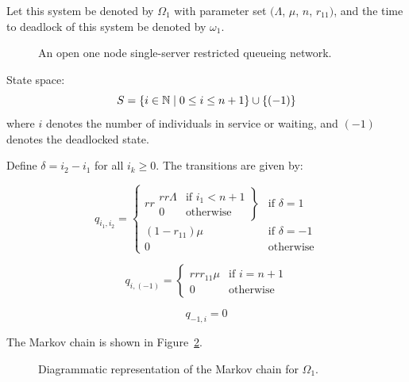 \documentclass{article}
\numberwithin{equation}{section}
\begin{document}
Let this system be denoted by $\Omega_1$ with parameter set $(\Lambda$, $\mu$, $n$, $r_{11})$, and the time to deadlock of this system be denoted by $\omega_1$.

\begin{figure}[!htbp]
  \begin{center}
  
  \end{center}
  \caption{An open one node single-server restricted queueing network.}
  \label{fig:queueingnetwork_1node}
\end{figure}

State space:
        \[S = \{i\in\mathbb{N} \nonscript\; | \nonscript\; 0 \leq i \leq n + 1
        \}\cup\{(-1)\}\]
where \(i\) denotes the number of individuals in service or waiting, and $(-1)$ denotes the deadlocked state.

Define $\delta = i_2 - i_1$ for all $i_k \geq 0$. The transitions are given by:

\begin{equation}
  q_{i_1, i_2} = \left\{
  \begin{matrix}{rr}
    \left. \begin{matrix}{rr}
      \Lambda & \text{if } i_1 < n + 1 \\
      0 & \text{otherwise}
    \end{matrix} \right\} & \text{if } \delta = 1 \\
    (1 - r_{11})\mu & \text{if } \delta = -1 \\
    0 & \text{otherwise}
  \end{matrix} \right.
\end{equation}

\begin{equation}
  q_{i, (-1)} = \left\{
  \begin{matrix}{rr}
    r_{11}\mu & \text{if } i = n + 1 \\
    0 & \text{otherwise}
  \end{matrix}
  \right.
\end{equation}

\begin{equation}
  q_{-1, i} = 0
\end{equation}

The Markov chain is shown in Figure~\ref{fig:1nodeMC}.

\begin{figure}[!htbp]
  \begin{center}
    
  \end{center}
  \caption{Diagrammatic representation of the Markov chain for $\Omega_1$.}
  \label{fig:1nodeMC}
\end{figure}
\end{document}
